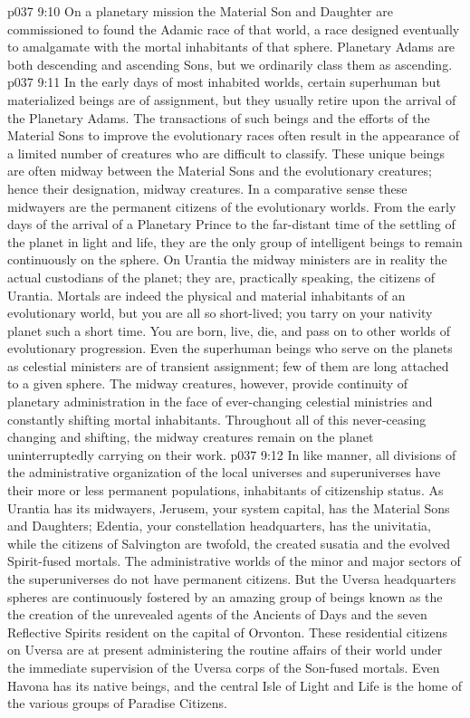 \vs p037 9:10 On a planetary mission the Material Son and Daughter are commissioned to found the Adamic race of that world, a race designed eventually to amalgamate with the mortal inhabitants of that sphere. Planetary Adams are both descending and ascending Sons, but we ordinarily class them as ascending.
\pc \vs p037 9:11  In the early days of most inhabited worlds, certain superhuman but materialized beings are of assignment, but they usually retire upon the arrival of the Planetary Adams. The transactions of such beings and the efforts of the Material Sons to improve the evolutionary races often result in the appearance of a limited number of creatures who are difficult to classify. These unique beings are often midway between the Material Sons and the evolutionary creatures; hence their designation, midway creatures. In a comparative sense these midwayers are the permanent citizens of the evolutionary worlds. From the early days of the arrival of a Planetary Prince to the far\hyp{}distant time of the settling of the planet in light and life, they are the only group of intelligent beings to remain continuously on the sphere. On Urantia the midway ministers are in reality the actual custodians of the planet; they are, practically speaking, the citizens of Urantia. Mortals are indeed the physical and material inhabitants of an evolutionary world, but you are all so short\hyp{}lived; you tarry on your nativity planet such a short time. You are born, live, die, and pass on to other worlds of evolutionary progression. Even the superhuman beings who serve on the planets as celestial ministers are of transient assignment; few of them are long attached to a given sphere. The midway creatures, however, provide continuity of planetary administration in the face of ever\hyp{}changing celestial ministries and constantly shifting mortal inhabitants. Throughout all of this never\hyp{}ceasing changing and shifting, the midway creatures remain on the planet uninterruptedly carrying on their work.
\pc \vs p037 9:12 In like manner, all divisions of the administrative organization of the local universes and superuniverses have their more or less permanent populations, inhabitants of citizenship status. As Urantia has its midwayers, Jerusem, your system capital, has the Material Sons and Daughters; Edentia, your constellation headquarters, has the univitatia, while the citizens of Salvington are twofold, the created susatia and the evolved Spirit\hyp{}fused mortals. The administrative worlds of the minor and major sectors of the superuniverses do not have permanent citizens. But the Uversa headquarters spheres are continuously fostered by an amazing group of beings known as the  the creation of the unrevealed agents of the Ancients of Days and the seven Reflective Spirits resident on the capital of Orvonton. These residential citizens on Uversa are at present administering the routine affairs of their world under the immediate supervision of the Uversa corps of the Son\hyp{}fused mortals. Even Havona has its native beings, and the central Isle of Light and Life is the home of the various groups of Paradise Citizens.\plusone
